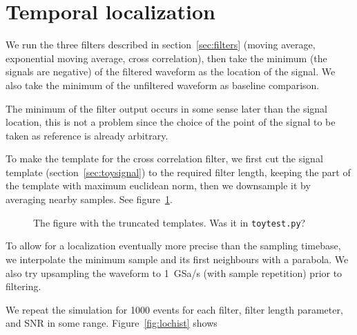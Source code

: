 \section{Temporal localization}

We run the three filters described in section~\ref{sec:filters} (moving
average, exponential moving average, cross correlation), then take the minimum
(the signals are negative) of the filtered waveform as the location of the
signal. We also take the minimum of the unfiltered waveform as baseline
comparison.

The minimum of the filter output occurs in some sense later than the signal
location, this is not a problem since the choice of the point of the signal to
be taken as reference is already arbitrary.

To make the template for the cross correlation filter, we first cut the signal template (section~\ref{sec:toysignal}) to the required filter length, keeping the part of the template with maximum euclidean norm, then we downsample it by
averaging nearby samples. See figure~\ref{fig:toyfilttempl}.

\begin{figure}
    The figure with the truncated templates. Was it in \verb'toytest.py'?
    \caption{}
    \label{fig:toyfilttempl}
\end{figure}

To allow for a localization eventually more precise than the sampling timebase,
we interpolate the minimum sample and its first neighbours with a parabola. We
also try upsampling the waveform to \SI{1}{GSa/s} (with sample repetition)
prior to filtering.

We repeat the simulation for 1000 events for each filter, filter length
parameter, and SNR in some range. Figure~\ref{fig:lochist} shows 

